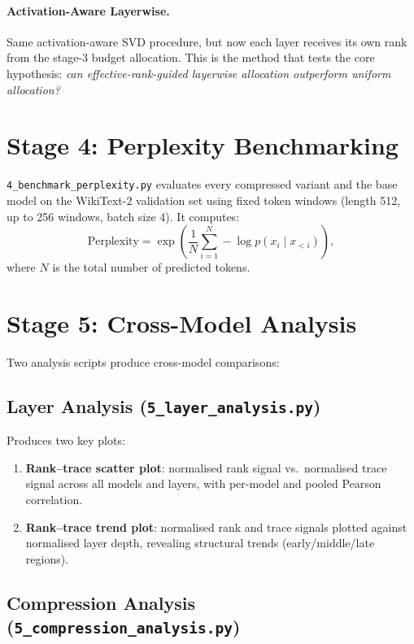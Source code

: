 \documentclass[11pt]{article}
\begin{document}
\paragraph{Activation-Aware Layerwise.}
Same activation-aware SVD procedure, but now each layer receives its own rank from the stage-3 budget allocation.  This is the method that tests the core hypothesis: \emph{can effective-rank-guided layerwise allocation outperform uniform allocation?}

\section{Stage 4: Perplexity Benchmarking}

\texttt{4\_benchmark\_perplexity.py} evaluates every compressed variant and the base model on the WikiText-2 validation set using fixed token windows (length 512, up to 256 windows, batch size 4).  It computes:
\[
    \text{Perplexity} = \exp\left(\frac{1}{N}\sum_{i=1}^{N} -\log p(x_i \mid x_{<i})\right),
\]
where $N$ is the total number of predicted tokens.

\section{Stage 5: Cross-Model Analysis}

Two analysis scripts produce cross-model comparisons:

\subsection{Layer Analysis (\texttt{5\_layer\_analysis.py})}

Produces two key plots:
\begin{enumerate}
    \item \textbf{Rank--trace scatter plot}: normalised rank signal vs.\ normalised trace signal across all models and layers, with per-model and pooled Pearson correlation.
    \item \textbf{Rank--trace trend plot}: normalised rank and trace signals plotted against normalised layer depth, revealing structural trends (early/middle/late regions).
\end{enumerate}

\subsection{Compression Analysis (\texttt{5\_compression\_analysis.py})}
\end{document}
